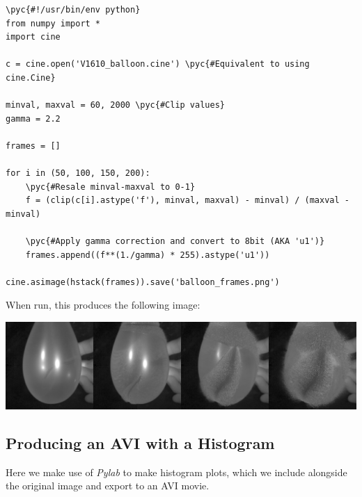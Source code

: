 \documentclass[11pt]{amsart}
\newcommand{\pyc}[1]{\textcolor{comment_color}{#1}}
\begin{document}
\begin{Verbatim}[frame=lines, label=example1.py, labelposition=topline, commandchars=\\\{\}]
\pyc{#!/usr/bin/env python}
from numpy import *
import cine

c = cine.open('V1610_balloon.cine') \pyc{#Equivalent to using cine.Cine}

minval, maxval = 60, 2000 \pyc{#Clip values}
gamma = 2.2

frames = []

for i in (50, 100, 150, 200):
    \pyc{#Resale minval-maxval to 0-1}
    f = (clip(c[i].astype('f'), minval, maxval) - minval) / (maxval - minval)
    
    \pyc{#Apply gamma correction and convert to 8bit (AKA 'u1')}
    frames.append((f**(1./gamma) * 255).astype('u1'))
    
cine.asimage(hstack(frames)).save('balloon_frames.png')
\end{Verbatim}

When run, this produces the following image:

\includegraphics[width=6in]{figures/balloon_frames.png}

\vfill \pagebreak
\subsection{Producing an AVI with a Histogram}
Here we make use of \emph{Pylab} to make histogram plots, which we include alongside the original image and export to an AVI movie.
\end{document}
